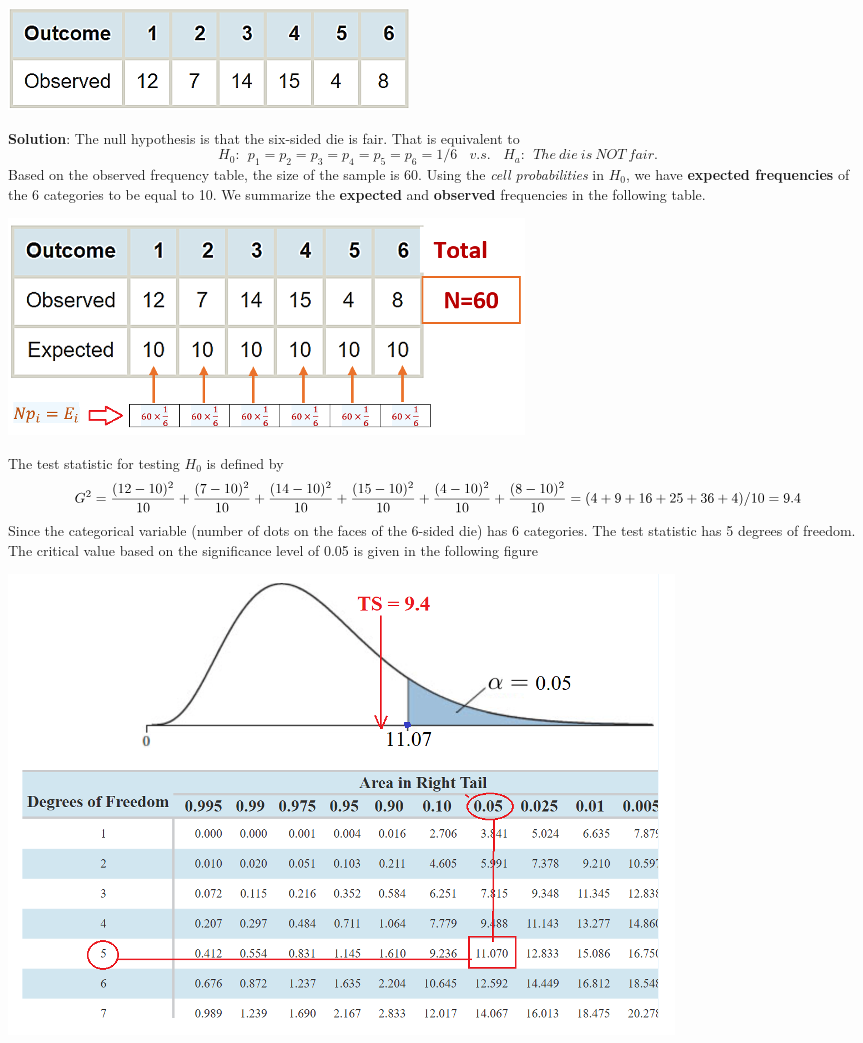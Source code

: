 \documentclass[
]{book}
\begin{document}
\begin{center}\includegraphics[width=0.35\linewidth]{week13/example03Data} \end{center}

\textbf{Solution}: The null hypothesis is that the six-sided die is fair. That is equivalent to
\[
H_0: \ \  p_1 = p_2 = p_3 = p_4 = p_5 = p_6 = 1/6 \ \ \ \ v.s. \ \ \ \ H_a: \ \ The \ die \ is \ NOT \ fair.
\]
Based on the observed frequency table, the size of the sample is 60. Using the \emph{cell probabilities} in \(H_0\), we have \textbf{expected frequencies} of the 6 categories to be equal to 10. We summarize the \textbf{expected} and \textbf{observed} frequencies in the following table.

\begin{center}\includegraphics[width=0.45\linewidth]{week13/example03} \end{center}

The test statistic for testing \(H_0\) is defined by
\[
G^2 = \frac{(12-10)^2}{10}+\frac{(7-10)^2}{10}+\frac{(14-10)^2}{10}+\frac{(15-10)^2}{10}
+\frac{(4-10)^2}{10}+\frac{(8-10)^2}{10} \\ =(4+9+16+25+36+4)/10=9.4
\]
Since the categorical variable (number of dots on the faces of the 6-sided die) has 6 categories. The test statistic has 5 degrees of freedom. The critical value based on the significance level of 0.05 is given in the following figure

\begin{center}\includegraphics[width=0.85\linewidth]{week13/example03CV} \end{center}
\end{document}
